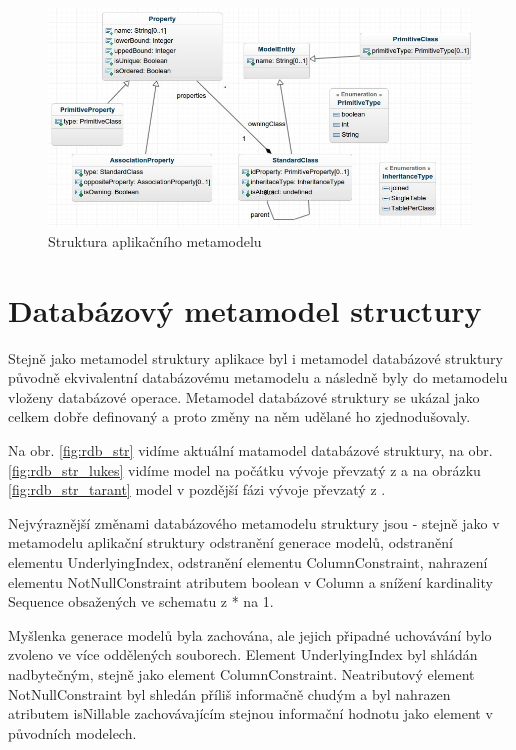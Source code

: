 \documentclass[11pt,twoside,a4paper]{book}
\begin{document}
\begin{figure}[ht]
\begin{center}
\includegraphics[width=15cm]{figures/app_meta}
\caption{Struktura aplikačního metamodelu}
\label{fig:app_meta}
\end{center}
\end{figure}

\section{Databázový metamodel structury}

Stejně jako metamodel struktury aplikace byl i metamodel databázové struktury
původně ekvivalentní databázovému metamodelu a následně byly do metamodelu
vloženy databázové operace. Metamodel databázové struktury se ukázal jako
celkem dobře definovaný a proto změny na něm udělané ho zjednodušovaly.

Na obr. \ref{fig:rdb_str} vidíme aktuální matamodel databázové struktury, na
obr. \ref{fig:rdb_str_lukes} vidíme model na počátku vývoje převzatý z
\cite{Lukes} a na obrázku \ref{fig:rdb_str_tarant} model v pozdější fázi vývoje
převzatý z \cite{Tarant_bp}.

 Nejvýraznější změnami databázového metamodelu struktury jsou - stejně jako v
 metamodelu aplikační struktury odstranění generace modelů, odstranění elementu
 UnderlyingIndex, odstranění elementu ColumnConstraint, nahrazení elementu
 NotNullConstraint atributem boolean v Column a snížení kardinality Sequence
 obsažených ve schematu z * na 1.
 
 Myšlenka generace modelů byla zachována, ale jejich připadné uchovávání bylo
 zvoleno ve více oddělených souborech. Element UnderlyingIndex byl shládán
 nadbytečným, stejně jako element ColumnConstraint. Neatributový element
 NotNullConstraint byl shledán příliš informačně chudým a byl nahrazen atributem
 isNillable zachovávajícím stejnou informační hodnotu jako element v původních
 modelech. 
	
\end{document}
